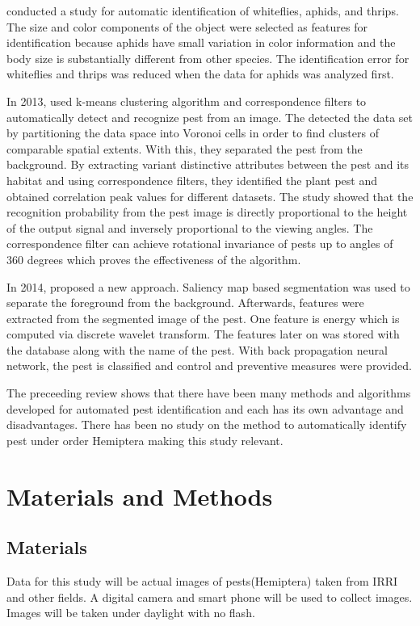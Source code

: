 \documentclass[journal]{./IEEE/IEEEtran}
\begin{document}
\cite{article_cho} conducted a study for automatic identification of whiteflies, aphids, and thrips. The size and color components of the object were selected as features for identification because aphids have small variation in color information and the body size is substantially different from other species. The identification error for whiteflies and thrips was reduced when the data for aphids was analyzed first.

In 2013, \cite{article_fina} used k-means clustering algorithm and correspondence filters to automatically detect and recognize pest from an image. The detected the data set by partitioning the data space into Voronoi cells in order to find clusters of comparable spatial extents. With this, they separated the pest from the background. By extracting variant distinctive attributes between the pest and its habitat and using correspondence filters, they identified the plant pest and obtained correlation peak values for different datasets. The study showed that the recognition probability from the pest image is directly proportional to the height of the output signal and inversely proportional to the viewing angles. The correspondence filter can achieve rotational invariance of pests up to angles of 360 degrees which proves the effectiveness of the algorithm.

In 2014, \cite{article_kandalkar3} proposed a new approach. Saliency map based segmentation was used to separate the foreground from the background. Afterwards, features were extracted from the segmented image of the pest. One feature is energy which is computed via discrete wavelet transform. The features later on was stored with the database along with the name of the pest. With back propagation neural network, the pest is classified and control and preventive measures were provided.

The preceeding review shows that there have been many methods and algorithms developed for automated pest identification and each has its own advantage and disadvantages. There has been no study on the method to automatically identify pest under order Hemiptera making this study relevant.

\section{Materials and Methods}

\subsection{Materials}
Data for this study will be actual images of pests(Hemiptera) taken from IRRI and other fields. A digital camera and smart phone will be used to collect images. Images will be taken under daylight with no flash.
\end{document}
